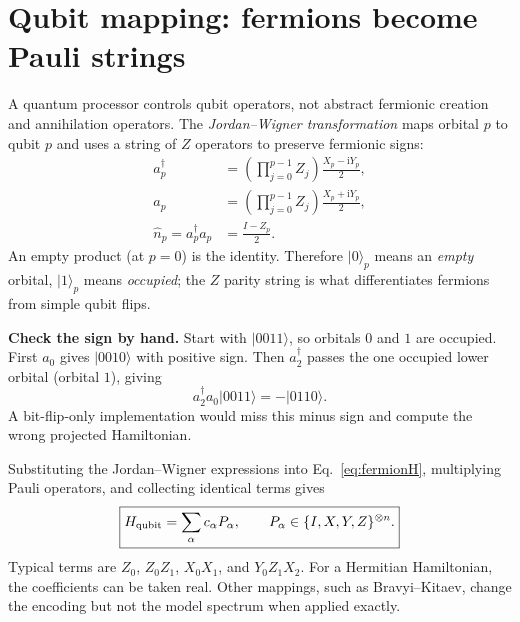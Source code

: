 \documentclass[11pt,a4paper,oneside]{report}
\newcommand{\ket}[1]{\lvert #1\rangle}
\newcommand{\I}{\mathrm i}
\begin{document}
\section{Qubit mapping: fermions become Pauli strings}
A quantum processor controls qubit operators, not abstract fermionic creation and annihilation operators. The \emph{Jordan--Wigner transformation} maps orbital $p$ to qubit $p$ and uses a string of $Z$ operators to preserve fermionic signs:
\begin{align}\label{eq:JW}
 a_p^\dagger&=\left(\prod_{j=0}^{p-1}Z_j\right)\frac{X_p-\I Y_p}{2},\\
 a_p&=\left(\prod_{j=0}^{p-1}Z_j\right)\frac{X_p+\I Y_p}{2},\\
 \hat n_p=a_p^\dagger a_p&=\frac{I-Z_p}{2}.
\end{align}
An empty product (at $p=0$) is the identity. Therefore $\ket0_p$ means an \emph{empty} orbital, $\ket1_p$ means \emph{occupied}; the $Z$ parity string is what differentiates fermions from simple qubit flips.

\textbf{Check the sign by hand.} Start with $\ket{0011}$, so orbitals $0$ and $1$ are occupied. First $a_0$ gives $\ket{0010}$ with positive sign. Then $a_2^\dagger$ passes the one occupied lower orbital (orbital $1$), giving
\begin{equation}
 a_2^\dagger a_0\ket{0011}=-\ket{0110}.
\end{equation}
A bit-flip-only implementation would miss this minus sign and compute the wrong projected Hamiltonian.

Substituting the Jordan--Wigner expressions into Eq.~\eqref{eq:fermionH}, multiplying Pauli operators, and collecting identical terms gives
\begin{equation}\label{eq:qubitPaulis}
\boxed{\displaystyle H_{\rm qubit}=\sum_{\alpha}c_\alpha P_\alpha,
\qquad P_\alpha\in\{I,X,Y,Z\}^{\otimes n}.}
\end{equation}
Typical terms are $Z_0$, $Z_0Z_1$, $X_0X_1$, and $Y_0Z_1X_2$. For a Hermitian Hamiltonian, the coefficients can be taken real. Other mappings, such as Bravyi--Kitaev, change the encoding but not the model spectrum when applied exactly.
\end{document}
